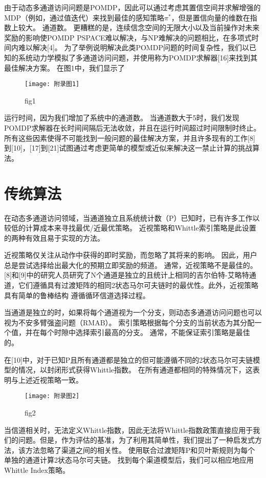 由于动态多通道访问问题是POMDP，因此可以通过考虑其置信空间并求解增强的MDP（例如，通过值迭代）来找到最佳的感知策略$\pi^{*}$，但是置信向量的维数在指数上较大。 通道数。 更糟糕的是，连续信念空间的无限大小以及当前操作对未来奖励的影响使POMDP PSPACE难以解决，与NP难解决的问题相比，在多项式时间内难以解决[4]。 为了举例说明解决此类POMDP问题的时间复杂性，我们以已知的系统动力学模拟了多通道访问问题，并使用称为POMDP求解器[16]来找到其最佳解决方案。 在图1中，我们显示了
\begin{figure}[h]
	\centering
	\texttt{[image: 附录图1]}
	\caption{fig1}
\end{figure}

运行时间，因为我们增加了系统中的通道数。 当通道数大于5时，我们发现POMDP求解器在长时间间隔后无法收敛，并且在运行时间超过时间限制时终止。 所有这些因素使得不可能找到一般问题的最佳解决方案，并且许多现有的工作[8]到[10]，[17]到[21]试图通过考虑更简单的模型或近似来解决这一禁止计算的挑战算法。

\section*{ 传统算法  }
在动态多通道访问领域，当通道独立且系统统计数（P）已知时，已有许多工作以较低的计算成本来寻找最优/近最优策略。 近视策略和Whittle索引策略是此设置的两种有效且易于实现的方法。

近视策略仅关注从动作中获得的即时奖励，而忽略了其将来的影响。 因此，用户总是尝试选择给出最大化的预期立即奖励的频道。 通常，近视策略不是最佳的。 [8]和[9]中的研究人员研究了N个通道是独立的且统计上相同的吉尔伯特-艾略特通道，它们遵循具有过渡矩阵的相同2状态马尔可夫链时的最优性。此外，近视策略具有简单的鲁棒结构 遵循循环信道选择过程。

当通道是独立的时，如果将每个通道视为一个分支，则动态多通道访问问题也可以视为不安多臂强盗问题（RMAB）。 索引策略根据每个分支的当前状态为其分配一个值，并在每个时隙中选择索引最高的分支。 通常，不能保证索引策略是最佳的。

在[10]中，对于已知P且所有通道都是独立的但可能遵循不同的2状态马尔可夫链模型的情况，以封闭形式获得Whittle指数。 在所有通道都相同的特殊情况下，这表明与上述近视策略一致。
\begin{figure}[h]
	\centering
	\texttt{[image: 附录图2]}
	\caption{fig2}
\end{figure}
当信道相关时，无法定义Whittle指数，因此无法将Whittle指数政策直接应用于我们的问题。但是，作为评估的基准，为了利用其简单性，我们提出了一种启发式方法，该方法忽略了渠道之间的相关性。 使用联合过渡矩阵P和贝叶斯规则为每个单独的通道计算2状态马尔可夫链。 找到每个渠道模型后，我们可以相应地应用Whittle Index策略。


